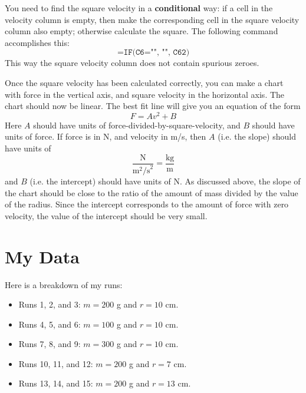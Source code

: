 You need to find the square velocity in a \textbf{conditional} way: if a cell in the velocity column is empty, then make the corresponding cell in the square velocity column also empty; otherwise calculate the square. The following command accomplishes this:
\begin{equation}
    \texttt{=IF(C6="", "", C6\^{}2)}
\end{equation}
This way the square velocity column does not contain spurious zeroes.

Once the square velocity has been calculated correctly, you can make a chart with force in the vertical axis, and square velocity in the horizontal axis. The chart should now be linear. The best fit line will give you an equation of the form
\begin{equation}
    F = A v^{2} + B
\end{equation}
Here $A$ should have units of force-divided-by-square-velocity, and $B$ should have units of force. If force is in N, and velocity in m/s, then $A$ (i.e. the slope) should have units of
\begin{equation}
    \frac{\text{N}}{\text{m}^{2}\text{/s}^{2}} = \frac{\text{kg}}{\text{m}}
\end{equation}
and $B$ (i.e. the intercept) should have units of N. As discussed above, the slope of the chart should be close to the ratio of the amount of mass divided by the value of the radius. Since the intercept corresponds to the amount of force with zero velocity, the value of the intercept should be very small.
\section{My Data}
Here is a breakdown of my runs:
\begin{itemize}
    \item Runs 1, 2, and 3: $m = 200$ g and $r = 10$ cm.
    \item Runs 4, 5, and 6: $m = 100$ g and $r = 10$ cm.
    \item Runs 7, 8, and 9: $m = 300$ g and $r = 10$ cm.
    \item Runs 10, 11, and 12: $m = 200$ g and $r = 7$ cm.
    \item Runs 13, 14, and 15: $m = 200$ g and $r = 13$ cm.
\end{itemize}
